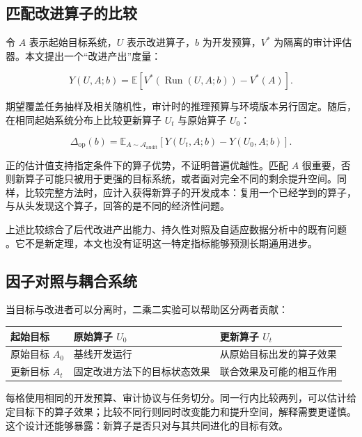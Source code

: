 \documentclass[11pt,,]{article}
\begin{document}
\hypertarget{ux5339ux914dux6539ux8fdbux7b97ux5b50ux7684ux6bd4ux8f83}{%
\subsection{匹配改进算子的比较}\label{ux5339ux914dux6539ux8fdbux7b97ux5b50ux7684ux6bd4ux8f83}}

令 \(A\) 表示起始目标系统，\(U\) 表示改进算子，\(b\) 为开发预算，\(V^*\)
为隔离的审计评估器。本文提出一个``改进产出''度量：

\[
Y(U,A;b)=\mathbb{E}\left[V^*(\operatorname{Run}(U,A;b))-V^*(A)\right].
\]

期望覆盖任务抽样及相关随机性，审计时的推理预算与环境版本另行固定。随后，在相同起始系统分布上比较更新算子
\(U_t\) 与原始算子 \(U_0\)：

\[
\Delta_{\mathrm{op}}(b)=\mathbb{E}_{A\sim\mathcal{A}_{\mathrm{audit}}}
\left[Y(U_t,A;b)-Y(U_0,A;b)\right].
\]

正的估计值支持指定条件下的算子优势，不证明普遍优越性。匹配 \(A\)
很重要，否则新算子可能只被用于更强的目标系统，或者面对完全不同的剩余提升空间。同样，比较完整方法时，应计入获得新算子的开发成本：复用一个已经学到的算子，与从头发现这个算子，回答的是不同的经济性问题。

上述比较综合了后代改进产出能力、持久性对照及自适应数据分析中的既有问题
\citep{hgm2025, pastbench2026, adaptive2015}。它不是新定理，本文也没有证明这一特定指标能够预测长期通用进步。

\hypertarget{ux56e0ux5b50ux5bf9ux7167ux4e0eux8026ux5408ux7cfbux7edf}{%
\subsection{因子对照与耦合系统}\label{ux56e0ux5b50ux5bf9ux7167ux4e0eux8026ux5408ux7cfbux7edf}}

当目标与改进者可以分离时，二乘二实验可以帮助区分两者贡献：

\begin{longtable}[]{@{}lll@{}}
\toprule
起始目标 & 原始算子 \(U_0\) & 更新算子 \(U_t\)\tabularnewline
\midrule
\endhead
原始目标 \(A_0\) & 基线开发运行 &
从原始目标出发的算子效果\tabularnewline
更新目标 \(A_t\) & 固定改进方法下的目标状态效果 &
联合效果及可能的相互作用\tabularnewline
\bottomrule
\end{longtable}

每格使用相同的开发预算、审计协议与任务切分。同一行内比较两列，可以估计给定目标下的算子效果；比较不同行则同时改变能力和提升空间，解释需要更谨慎。这个设计还能够暴露：新算子是否只对与其共同进化的目标有效。
\end{document}
